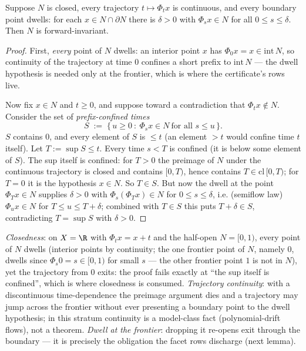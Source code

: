 \begin{blemma}\label{lem:qbi-dwell}
Suppose $N$ is closed, every trajectory $t \mapsto \Phi_t x$ is
continuous, and every boundary point dwells: for each
$x \in N \cap \partial N$ there is $\delta > 0$ with
$\Phi_s x \in N$ for all $0 \leq s \leq \delta$. Then $N$ is
forward-invariant.
\end{blemma}
\begin{proof}
First, \emph{every} point of $N$ dwells: an interior point $x$ has
$\Phi_0 x = x \in \mathrm{int}\,N$, so continuity of the trajectory at
time $0$ confines a short prefix to $\mathrm{int}\,N$ --- the dwell
hypothesis is needed only at the frontier, which is where the
certificate's rows live.

Now fix $x \in N$ and $t \geq 0$, and suppose toward a contradiction
that $\Phi_t x \notin N$. Consider the set of \emph{prefix-confined
times}
\[
S \;:=\; \{\, u \geq 0 \ :\ \Phi_s x \in N \ \text{for all } s \leq u
\,\}.
\]
$S$ contains $0$, and every element of $S$ is $\leq t$ (an element
$> t$ would confine time $t$ itself). Let $T := \sup S \leq t$. Every
time $s < T$ is confined (it is below some element of $S$). The sup
itself is confined: for $T > 0$ the preimage of $N$ under the
continuous trajectory is closed and contains $[0, T)$, hence contains
$T \in \mathrm{cl}\,[0,T)$; for $T = 0$ it is the hypothesis
$x \in N$. So $T \in S$. But now the dwell at the point $\Phi_T x \in N$
supplies $\delta > 0$ with $\Phi_s(\Phi_T x) \in N$ for
$0 \leq s \leq \delta$,
i.e. (semiflow law) $\Phi_u x \in N$ for $T \leq u \leq T + \delta$;
combined with $T \in S$ this puts $T + \delta \in S$, contradicting
$T = \sup S$ with $\delta > 0$.
\end{proof}

\begin{bremark}
\emph{Closedness}: on $X = \R$ with $\Phi_t x = x + t$ and the
half-open $N = [0, 1)$, every point of $N$ dwells (interior points by
continuity; the one frontier point of $N$, namely $0$, dwells since
$\Phi_s 0 = s \in [0,1)$ for small $s$ --- the other frontier point
$1$ is not in $N$), yet the trajectory from $0$ exits: the proof fails
exactly at
``the sup itself is confined'', which is where closedness is consumed.
\emph{Trajectory continuity}: with a discontinuous time-dependence the
preimage argument dies and a trajectory may jump across the frontier
without ever presenting a boundary point to the dwell hypothesis; in
this stratum continuity is a model-class fact (polynomial-drift flows),
not a theorem. \emph{Dwell at the frontier}: dropping it re-opens exit
through the boundary --- it is precisely the obligation the facet rows
discharge (next lemma).
\end{bremark}

